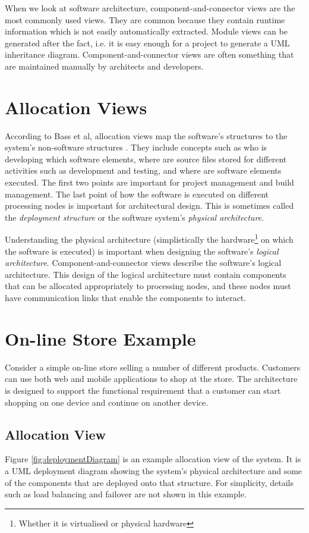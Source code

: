 When we look at software architecture, component-and-connector views are the most commonly used views.
They are common because they contain runtime information which is not easily automatically extracted.
Module views can be generated after the fact, i.e. it is easy enough for a project to generate a UML inheritance diagram.
Component-and-connector views are often something that are maintained manually by architects and developers.

\section{Allocation Views}
According to Bass et al, allocation views map the software's structures to the system's non-software structures \cite{bass2021software}.
They include concepts such as who is developing which software elements,
where are source files stored for different activities such as development and testing,
and where are software elements executed.
The first two points are important for project management and build management.
The last point of how the software is executed on different processing nodes is important for architectural design.
This is sometimes called the \emph{deployment structure} or the software system's \emph{physical architecture}.

Understanding the physical architecture (simplistically the hardware\footnote{Whether it is virtualised or physical hardware}
on which the software is executed) is important when designing the software's \emph{logical architecture}.
Component-and-connector views describe the software's logical architecture.
This design of the logical architecture must contain components that can be allocated appropriately to processing nodes,
and these nodes must have communication links that enable the components to interact.

\section{On-line Store Example}
Consider a simple on-line store selling a number of different products. Customers can use both web and mobile applications to shop at the store.
The architecture is designed to support the functional requirement that a customer can start shopping on one device and continue on another device.

\subsection{Allocation View}
Figure \ref{fig:deploymentDiagram} is an example allocation view of the system.
It is a UML deployment diagram showing the system's physical architecture
and some of the components that are deployed onto that structure.
For simplicity, details such as load balancing and failover are not shown in this example.

